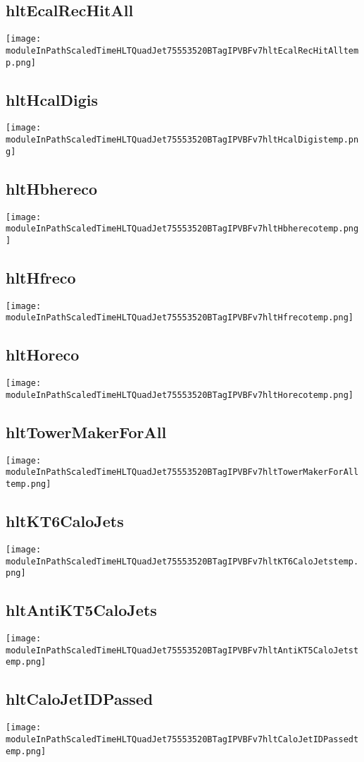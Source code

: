 \documentclass[10pt,a5paper,landscape]{report}
\begin{document}
\subsection{hltEcalRecHitAll} \centering \texttt{[image: moduleInPathScaledTimeHLTQuadJet75553520BTagIPVBFv7hltEcalRecHitAlltemp.png]}
\subsection{hltHcalDigis} \centering \texttt{[image: moduleInPathScaledTimeHLTQuadJet75553520BTagIPVBFv7hltHcalDigistemp.png]}
\subsection{hltHbhereco} \centering \texttt{[image: moduleInPathScaledTimeHLTQuadJet75553520BTagIPVBFv7hltHbherecotemp.png]}
\subsection{hltHfreco} \centering \texttt{[image: moduleInPathScaledTimeHLTQuadJet75553520BTagIPVBFv7hltHfrecotemp.png]}
\subsection{hltHoreco} \centering \texttt{[image: moduleInPathScaledTimeHLTQuadJet75553520BTagIPVBFv7hltHorecotemp.png]}
\subsection{hltTowerMakerForAll} \centering \texttt{[image: moduleInPathScaledTimeHLTQuadJet75553520BTagIPVBFv7hltTowerMakerForAlltemp.png]}
\subsection{hltKT6CaloJets} \centering \texttt{[image: moduleInPathScaledTimeHLTQuadJet75553520BTagIPVBFv7hltKT6CaloJetstemp.png]}
\subsection{hltAntiKT5CaloJets} \centering \texttt{[image: moduleInPathScaledTimeHLTQuadJet75553520BTagIPVBFv7hltAntiKT5CaloJetstemp.png]}
\subsection{hltCaloJetIDPassed} \centering \texttt{[image: moduleInPathScaledTimeHLTQuadJet75553520BTagIPVBFv7hltCaloJetIDPassedtemp.png]}
\end{document}
